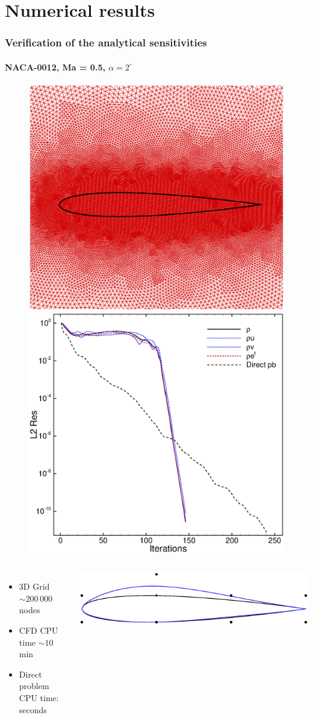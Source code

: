 \section{Numerical results}

\begin{frame}
  \frametitle{Verification of the analytical sensitivities}  
  \framesubtitle{NACA-0012, Ma = 0.5, $\alpha=2^\circ$}
  \vspace{-5mm}
  \begin{figure}[!ht]
    \centering
    \includegraphics[width=0.42\linewidth]{Fig/mesh_naca_sc}
    \hspace{4mm}
    \includegraphics[width=0.43\linewidth]{Fig/res_naca_sc}
  \end{figure}

  \begin{columns}
    \begin{itemize}
    \item 3D Grid $\sim 200\,000$ nodes
    \item CFD CPU time $\sim 10$ min
    \item Direct problem CPU time: seconds
    \end{itemize}
    \includegraphics[width=1.0\linewidth]{Fig/ffd}
  \end{columns}
\end{frame}


